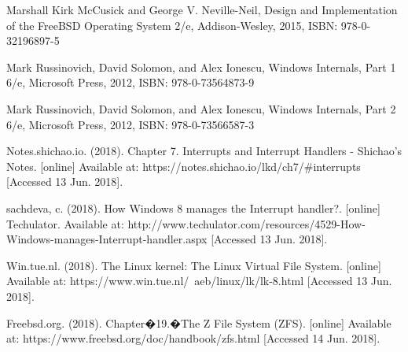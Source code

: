 \documentclass[draftclsnofoot, onecolumn] {report}
\begin{document}
Marshall Kirk McCusick and George V. Neville-Neil, Design and Implementation of the FreeBSD Operating System 2/e, Addison-Wesley, 2015, ISBN: 978-0-32196897-5

Mark Russinovich, David Solomon, and Alex Ionescu, Windows Internals, Part 1 6/e, Microsoft Press, 2012, ISBN: 978-0-73564873-9

Mark Russinovich, David Solomon, and Alex Ionescu, Windows Internals, Part 2 6/e, Microsoft Press, 2012, ISBN: 978-0-73566587-3

Notes.shichao.io. (2018). Chapter 7. Interrupts and Interrupt Handlers - Shichao's Notes. [online] Available at: https://notes.shichao.io/lkd/ch7/\#interrupts [Accessed 13 Jun. 2018].

sachdeva, c. (2018). How Windows 8 manages the Interrupt handler?. [online] Techulator. Available at: http://www.techulator.com/resources/4529-How-Windows-manages-Interrupt-handler.aspx [Accessed 13 Jun. 2018].

Win.tue.nl. (2018). The Linux kernel: The Linux Virtual File System. [online] Available at: https://www.win.tue.nl/~aeb/linux/lk/lk-8.html [Accessed 13 Jun. 2018].

Freebsd.org. (2018). Chapter�19.�The Z File System (ZFS). [online] Available at: https://www.freebsd.org/doc/handbook/zfs.html [Accessed 14 Jun. 2018].
\end{document}
